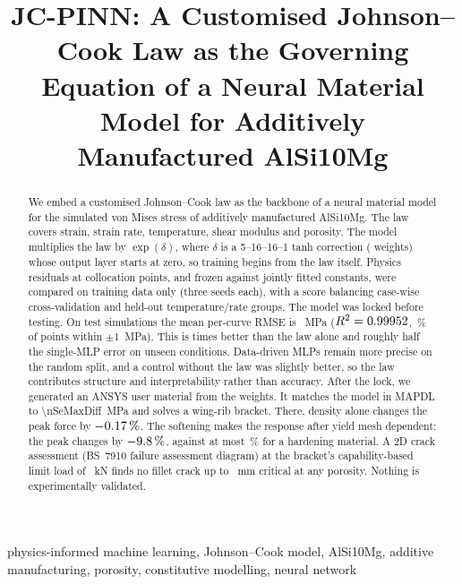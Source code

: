 \documentclass[conference]{IEEEtran}
\begin{document}
\title{JC-PINN: A Customised Johnson--Cook Law as the Governing Equation of a Neural Material Model for Additively Manufactured AlSi10Mg}
\author{}
\maketitle

\begin{abstract}
We embed a customised Johnson--Cook law as the backbone of a neural material model for the simulated von Mises stress of additively manufactured AlSi10Mg. The law covers strain, strain rate, temperature, shear modulus and porosity. The model multiplies the law by $\exp(\delta)$, where $\delta$ is a 5--16--16--1 tanh correction (\nParams{} weights) whose output layer starts at zero, so training begins from the law itself. Physics residuals at \nColloc{} collocation points, and frozen against jointly fitted constants, were compared on training data only (three seeds each), with a score balancing case-wise cross-validation and held-out temperature/rate groups. The model was locked before testing. On \nTestCasesSplit{} test simulations the mean per-curve RMSE is \nTestMean{}~MPa ($R^2=0.99952$, \nTestWithinOne\,\% of points within $\pm1$~MPa). This is \nImprovement{} times better than the law alone and roughly half the single-MLP error on unseen conditions. Data-driven MLPs remain more precise on the random split, and a control without the law was slightly better, so the law contributes structure and interpretability rather than accuracy. After the lock, we generated an ANSYS user material from the weights. It matches the model in MAPDL to \num{\nSeMaxDiff}~MPa and solves a wing-rib bracket. There, density alone changes the peak force by $-0.17\,\%$. The softening makes the response after yield mesh dependent: the peak changes by $-9.8\,\%$, against at most \nMeshEpMaxChangePct\,\% for a hardening material. A 2D crack assessment (BS~7910 failure assessment diagram) at the bracket's capability-based limit load of \nClLimitkN~kN finds no fillet crack up to \nClCrackMax~mm critical at any porosity. Nothing is experimentally validated.
\end{abstract}

\begin{IEEEkeywords}
physics-informed machine learning, Johnson--Cook model, AlSi10Mg, additive manufacturing, porosity, constitutive modelling, neural network
\end{IEEEkeywords}
\end{document}
